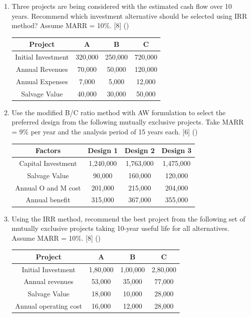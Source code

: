 \documentclass[12pt]{article}
\begin{document}
\begin{enumerate}
			\item Three projects are being considered with the estimated cash flow over 10 years. Recommend which investment alternative should be selected using IRR method? Assume MARR = 10\%. \hfill [8] ()\\
			\begin{tabular}{|c|c|c|c|}
				\hline
				Project & A & B & C \\ \hline
				Initial Investment & 320,000 & 250,000 & 720,000 \\ \hline
				Annual Revenues & 70,000 & 50,000 & 120,000 \\ \hline
				Annual Expenses & 7,000 & 5,000 & 12,000 \\ \hline
				Salvage Value & 40,000 & 30,000 & 50,000 \\ \hline
			\end{tabular}
			
			\item Use the modified B/C ratio method with AW formulation to select the preferred design from the following mutually exclusive projects. Take MARR = 9\% per year and the analysis period of 15 years each. \hfill [6] ()\\
			\begin{tabular}{|c|c|c|c|}
				\hline
				Factors & Design 1 & Design 2 & Design 3 \\ \hline
				Capital Investment & 1,240,000 & 1,763,000 & 1,475,000 \\ \hline
				Salvage Value & 90,000 & 160,000 & 120,000 \\ \hline
				Annual O and M cost & 201,000 & 215,000 & 204,000 \\ \hline
				Annual benefit & 315,000 & 367,000 & 355,000 \\ \hline
			\end{tabular}
			
			\item Using the IRR method, recommend the best project from the following set of mutually exclusive projects taking 10-year useful life for all alternatives. Assume MARR = 10\%. \hfill [8] ()\\
			\begin{tabular}{|c|c|c|c|}
				\hline
				Project & A & B & C \\ \hline
				Initial Investment & 1,80,000 & 1,00,000 & 2,80,000 \\ \hline
				Annual revenues & 53,000 & 35,000 & 77,000 \\ \hline
				Salvage Value & 18,000 & 10,000 & 28,000 \\ \hline
				Annual operating cost & 16,000 & 12,000 & 28,000 \\ \hline
			\end{tabular}


\end{enumerate}
\end{document}
